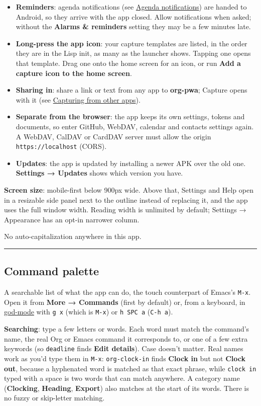 \documentclass[11pt]{article}
\begin{document}
\begin{itemize}
\item \textbf{Reminders}: agenda notifications (see \hyperref[sec:org4c355fc]{Agenda notifications}) are handed to Android, so they arrive with the app closed. Allow notifications when asked; without the \textbf{Alarms \& reminders} setting they may be a few minutes late.
\item \textbf{Long-press the app icon}: your capture templates are listed, in the order they are in the Lisp init, as many as the launcher shows. Tapping one opens that template. Drag one onto the home screen for an icon, or run \textbf{Add a capture icon to the home screen}.
\item \textbf{Sharing in}: share a link or text from any app to \textbf{org-pwa}; Capture opens with it (see \hyperref[sec:org46417ca]{Capturing from other apps}).
\item \textbf{Separate from the browser}: the app keeps its own settings, tokens and documents, so enter GitHub, WebDAV, calendar and contacts settings again. A WebDAV, CalDAV or CardDAV server must allow the origin \texttt{https://localhost} (CORS).
\item \textbf{Updates}: the app is updated by installing a newer APK over the old one. \textbf{Settings → Updates} shows which version you have.
\end{itemize}

\textbf{Screen size}: mobile-first below 900px wide. Above that, Settings and Help open in a resizable side panel next to the outline instead of replacing it, and the app uses the full window width. Reading width is unlimited by default; Settings → Appearance has an opt-in narrower column.

No auto-capitalization anywhere in this app.

\noindent\rule{\textwidth}{0.5pt}

\subsection{Command palette}
\label{sec:org55cb874}
A searchable list of what the app can do, the touch counterpart of Emacs's \texttt{M-x}. Open it from \textbf{More → Commands} (first by default) or, from a keyboard, in \hyperref[sec:orgc091c26]{god-mode} with \texttt{g x} (which is \texttt{M-x}) or \texttt{h SPC a} (\texttt{C-h a}).

\textbf{Searching}: type a few letters or words. Each word must match the command's name, the real Org or Emacs command it corresponds to, or one of a few extra keywords (so \texttt{deadline} finds \textbf{Edit details}). Case doesn't matter. Real names work as you'd type them in \texttt{M-x}: \texttt{org-clock-in} finds \textbf{Clock in} but not \textbf{Clock out}, because a hyphenated word is matched as that exact phrase, while \texttt{clock in} typed with a space is two words that can match anywhere. A category name (\textbf{Clocking}, \textbf{Heading}, \textbf{Export}) also matches at the start of its words. There is no fuzzy or skip-letter matching.
\end{document}
